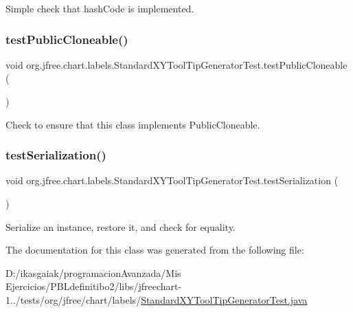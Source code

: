 Simple check that hash\+Code is implemented. \mbox{\label{classorg_1_1jfree_1_1chart_1_1labels_1_1_standard_x_y_tool_tip_generator_test_ae4abc726f1580371462b8aba4f101cbb}} 
\subsubsection{\texorpdfstring{test\+Public\+Cloneable()}{testPublicCloneable()}}
{\footnotesize\ttfamily void org.\+jfree.\+chart.\+labels.\+Standard\+X\+Y\+Tool\+Tip\+Generator\+Test.\+test\+Public\+Cloneable (\begin{DoxyParamCaption}{ }\end{DoxyParamCaption})}

Check to ensure that this class implements Public\+Cloneable. \mbox{\label{classorg_1_1jfree_1_1chart_1_1labels_1_1_standard_x_y_tool_tip_generator_test_ab783e169f905c8fa6c25f56ceec4057e}} 
\subsubsection{\texorpdfstring{test\+Serialization()}{testSerialization()}}
{\footnotesize\ttfamily void org.\+jfree.\+chart.\+labels.\+Standard\+X\+Y\+Tool\+Tip\+Generator\+Test.\+test\+Serialization (\begin{DoxyParamCaption}{ }\end{DoxyParamCaption})}

Serialize an instance, restore it, and check for equality. 

The documentation for this class was generated from the following file\+:\begin{DoxyCompactItemize}
\item 
D\+:/ikasgaiak/programacion\+Avanzada/\+Mis Ejercicios/\+P\+B\+Ldefinitibo2/libs/jfreechart-\/1../tests/org/jfree/chart/labels/\mbox{\hyperlink{_standard_x_y_tool_tip_generator_test_8java}{Standard\+X\+Y\+Tool\+Tip\+Generator\+Test.\+java}}\end{DoxyCompactItemize}
